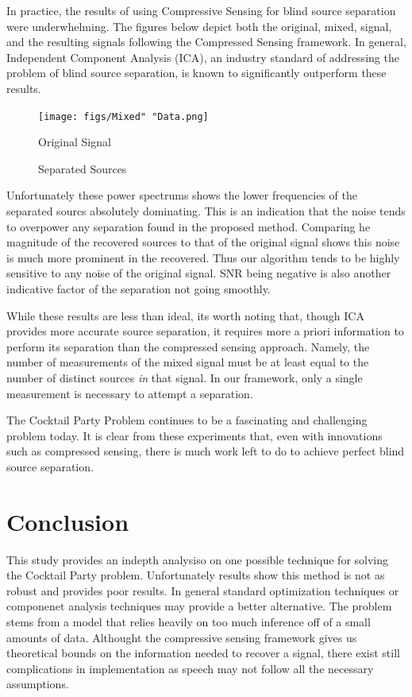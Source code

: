 \documentclass{article}
\begin{document}
In practice, the results of using Compressive Sensing for blind source separation were underwhelming. The figures below depict both the original, mixed, signal, and the resulting signals following the Compressed Sensing framework. In general, Independent Component Analysis (ICA), an industry standard of addressing the problem of blind source separation, is known to significantly outperform these results.

\begin{figure}[H]
  \centering
  \texttt{[image: figs/Mixed" "Data.png]}
  \caption{Original Signal}
\end{figure}

\begin{figure}[H]
  \centering
  \caption{Separated Sources}
\end{figure}

Unfortunately these power spectrums shows the lower frequencies of the separated sourcs absolutely dominating. This is an indication that the noise tends to overpower any separation found in the proposed method. Comparing he magnitude of the recovered sources to that of the original signal shows this noise is much more prominent in the recovered. Thus our algorithm tends to be highly sensitive to any noise of the original signal. SNR being negative is also another indicative factor of the separation not going smoothly. 

While these results are less than ideal, its worth noting that, though ICA provides more accurate source separation, it requires more a priori information to perform its separation than the compressed sensing approach. Namely, the number of measurements of the mixed signal must be at least equal to the number of distinct sources \textit{in} that signal. In our framework, only a single measurement is necessary to attempt a separation.

The Cocktail Party Problem continues to be a fascinating and challenging problem today. It is clear from these experiments that, even with innovations such as compressed sensing, there is much work left to do to achieve perfect blind source separation.

\section*{Conclusion}
This study provides an indepth analysiso on one possible technique for solving the Cocktail Party problem. Unfortunately results show this method is not as robust and provides poor results. In general standard optimization techniques or componenet analysis techniques may provide a better alternative. The problem stems from a model that relies heavily on too much inference off of a small amounts of data. Althought the compressive sensing framework gives us theoretical bounds on the information needed to recover a signal, there exist still complications in implementation as speech may not follow all the necessary assumptions. 
\end{document}
